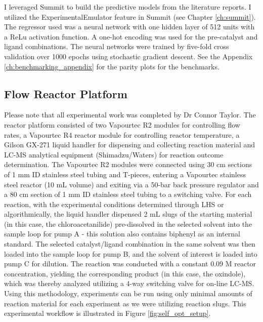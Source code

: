 I leveraged Summit to build the predictive models from the literature reports. I utilized the ExperimentalEmulator feature in Summit (see Chapter \ref{ch:summit}). The regressor used was a neural network with one hidden layer of 512 units with a ReLu activation function. A one-hot encoding was used for the pre-catalyst and ligand combinations. The neural networks were trained by five-fold cross validation over 1000 epochs using stochastic gradient descent. See the Appendix \ref{ch:benchmarking_appendix} for the parity plots for the benchmarks. 

\subsection{Flow Reactor Platform}

Please note that all experimental work was completed by Dr Connor Taylor. The reactor platform consisted of two Vapourtec R2 modules for controlling flow rates, a Vapourtec R4 reactor module for controlling reactor temperature, a Gilson GX-271 liquid handler for dispensing and collecting reaction material and LC-MS analytical equipment (Shimadzu/Waters) for reaction outcome determination. The Vapourtec R2 modules were connected using 30 cm sections of 1 mm ID stainless steel tubing and T-pieces, entering a Vapourtec stainless steel reactor (10 mL volume) and exiting via a 50-bar back pressure regulator and a 80 cm section of 1 mm ID stainless steel tubing to a switching valve. For each reaction, with the experimental conditions determined through LHS or algorithmically, the liquid handler dispensed 2 mL slugs of the starting material (in this case, the chloroacetanilide) pre-dissolved in the selected solvent into the sample loop for pump A - this solution also contains biphenyl as an internal standard. The selected catalyst/ligand combination in the same solvent was then loaded into the sample loop for pump B, and the solvent of interest is loaded into pump C for dilution. The reaction was conducted with a constant 0.09 M reactor concentration, yielding the corresponding product (in this case, the oxindole), which was thereby analyzed utilizing a 4-way switching valve for on-line LC-MS. Using this methodology, experiments can be run using only minimal amounts of reaction material for each experiment as we were utilizing reaction slugs. This experimental workflow is illustrated in Figure \ref{fig:self_opt_setup}.

